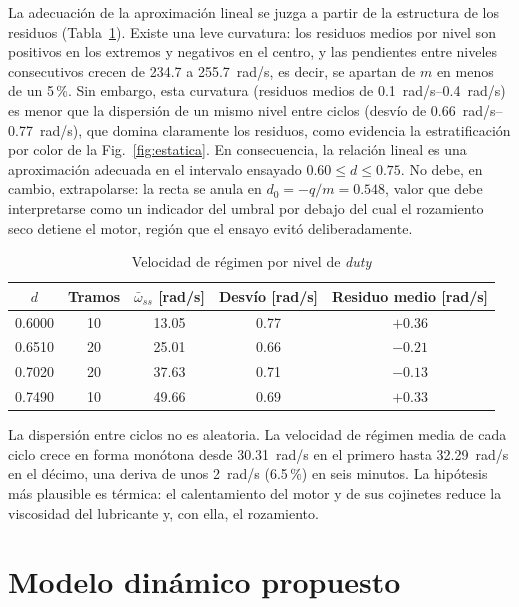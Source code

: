 \documentclass[journal,10pt,a4paper]{IEEEtran}
\begin{document}
La adecuación de la aproximación lineal se juzga a partir de la estructura de los residuos (Tabla~\ref{tab:niveles}). Existe una leve curvatura: los residuos medios por nivel son positivos en los extremos y negativos en el centro, y las pendientes entre niveles consecutivos crecen de \num{234.7} a \num{255.7}~rad/s, es decir, se apartan de $m$ en menos de un 5\,\%. Sin embargo, esta curvatura (residuos medios de \SIrange{0.1}{0.4}{rad/s}) es menor que la dispersión de un mismo nivel entre ciclos (desvío de \SIrange{0.66}{0.77}{rad/s}), que domina claramente los residuos, como evidencia la estratificación por color de la Fig.~\ref{fig:estatica}. En consecuencia, la relación lineal es una aproximación adecuada en el intervalo ensayado $0.60\le d\le0.75$. No debe, en cambio, extrapolarse: la recta se anula en $d_0=-q/m=0.548$, valor que debe interpretarse como un indicador del umbral por debajo del cual el rozamiento seco detiene el motor, región que el ensayo evitó deliberadamente.

\begin{table}[!t]
\centering
\caption{Velocidad de régimen por nivel de \emph{duty}}
\label{tab:niveles}
\setlength{\tabcolsep}{4pt}
\begin{tabular}{ccccc}
\toprule
$d$ & Tramos & $\bar\omega_{ss}$ [rad/s] & Desvío [rad/s] & Residuo medio [rad/s]\\
\midrule
0.6000 & 10 & 13.05 & 0.77 & $+0.36$\\
0.6510 & 20 & 25.01 & 0.66 & $-0.21$\\
0.7020 & 20 & 37.63 & 0.71 & $-0.13$\\
0.7490 & 10 & 49.66 & 0.69 & $+0.33$\\
\bottomrule
\end{tabular}
\end{table}

La dispersión entre ciclos no es aleatoria. La velocidad de régimen media de cada ciclo crece en forma monótona desde \SI{30.31}{rad/s} en el primero hasta \SI{32.29}{rad/s} en el décimo, una deriva de unos \SI{2}{rad/s} (6.5\,\%) en seis minutos. La hipótesis más plausible es térmica: el calentamiento del motor y de sus cojinetes reduce la viscosidad del lubricante y, con ella, el rozamiento.

\section{Modelo dinámico propuesto}\label{sec:a2}
\end{document}
